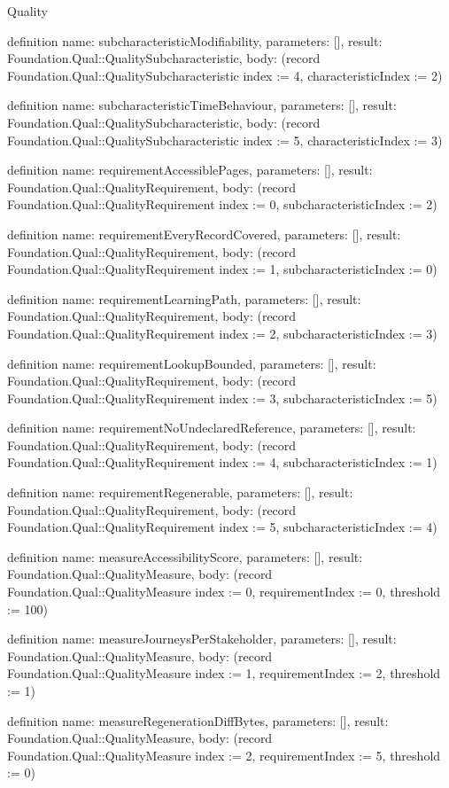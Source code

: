 \begin{lexlean}{Quality}
\begin{semanticmodule}
definition{
  name: subcharacteristicModifiability,
  parameters: [],
  result: Foundation.Qual::QualitySubcharacteristic,
  body: (record Foundation.Qual::QualitySubcharacteristic {index := 4, characteristicIndex := 2})
}

definition{
  name: subcharacteristicTimeBehaviour,
  parameters: [],
  result: Foundation.Qual::QualitySubcharacteristic,
  body: (record Foundation.Qual::QualitySubcharacteristic {index := 5, characteristicIndex := 3})
}

definition{
  name: requirementAccessiblePages,
  parameters: [],
  result: Foundation.Qual::QualityRequirement,
  body: (record Foundation.Qual::QualityRequirement {index := 0, subcharacteristicIndex := 2})
}

definition{
  name: requirementEveryRecordCovered,
  parameters: [],
  result: Foundation.Qual::QualityRequirement,
  body: (record Foundation.Qual::QualityRequirement {index := 1, subcharacteristicIndex := 0})
}

definition{
  name: requirementLearningPath,
  parameters: [],
  result: Foundation.Qual::QualityRequirement,
  body: (record Foundation.Qual::QualityRequirement {index := 2, subcharacteristicIndex := 3})
}

definition{
  name: requirementLookupBounded,
  parameters: [],
  result: Foundation.Qual::QualityRequirement,
  body: (record Foundation.Qual::QualityRequirement {index := 3, subcharacteristicIndex := 5})
}

definition{
  name: requirementNoUndeclaredReference,
  parameters: [],
  result: Foundation.Qual::QualityRequirement,
  body: (record Foundation.Qual::QualityRequirement {index := 4, subcharacteristicIndex := 1})
}

definition{
  name: requirementRegenerable,
  parameters: [],
  result: Foundation.Qual::QualityRequirement,
  body: (record Foundation.Qual::QualityRequirement {index := 5, subcharacteristicIndex := 4})
}

definition{
  name: measureAccessibilityScore,
  parameters: [],
  result: Foundation.Qual::QualityMeasure,
  body: (record Foundation.Qual::QualityMeasure {index := 0, requirementIndex := 0, threshold := 100})
}

definition{
  name: measureJourneysPerStakeholder,
  parameters: [],
  result: Foundation.Qual::QualityMeasure,
  body: (record Foundation.Qual::QualityMeasure {index := 1, requirementIndex := 2, threshold := 1})
}

definition{
  name: measureRegenerationDiffBytes,
  parameters: [],
  result: Foundation.Qual::QualityMeasure,
  body: (record Foundation.Qual::QualityMeasure {index := 2, requirementIndex := 5, threshold := 0})
}


\end{semanticmodule}
\end{lexlean}
